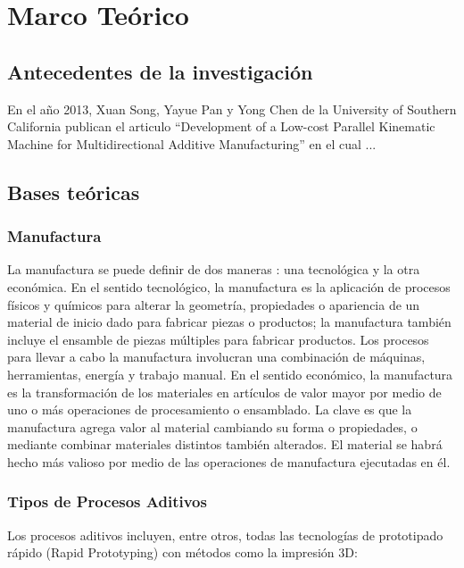 \chapter{Marco Teórico}

\section{Antecedentes de la investigación}

En el año 2013, Xuan Song, Yayue Pan y Yong Chen de la University of Southern California publican el articulo “Development of a Low-cost Parallel Kinematic Machine for Multidirectional Additive Manufacturing” en el cual ...

\newpage
\section{Bases teóricas}

\subsection{Manufactura}

La manufactura se puede definir de dos maneras \cite{Groover}: una tecnológica y la otra económica. En el sentido tecnológico, la manufactura es la aplicación de procesos físicos y químicos para alterar la geometría, propiedades o apariencia de un material de inicio dado para fabricar piezas o productos; la manufactura también incluye el ensamble de piezas múltiples para fabricar productos. Los procesos para llevar a cabo la manufactura involucran una combinación de máquinas, herramientas, energía y trabajo manual. En el sentido económico, la manufactura es la transformación de los materiales en artículos de valor mayor por medio de uno o más operaciones de procesamiento o ensamblado. La clave es que la manufactura agrega valor al material cambiando su forma o propiedades, o mediante combinar materiales distintos
también alterados. El material se habrá hecho más valioso por medio de las operaciones de manufactura ejecutadas en él.

\subsection{Tipos de Procesos Aditivos}

Los procesos aditivos incluyen, entre otros, todas las tecnologías de prototipado rápido (Rapid Prototyping) con métodos como la impresión 3D: 

